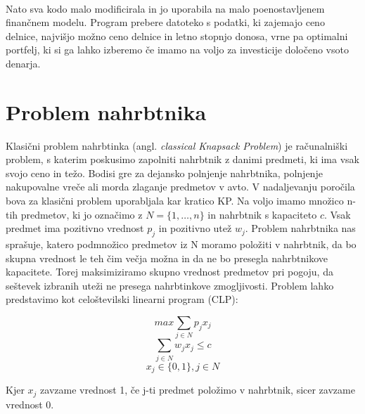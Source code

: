 \documentclass[a4paper,12pt]{article}
\theoremstyle{definition}
\begin{document}
\paragraph{}
Nato sva kodo malo modificirala in jo uporabila na malo poenostavljenem finančnem modelu. 
Program prebere datoteko s podatki, ki zajemajo ceno delnice, najvišjo možno ceno delnice in letno stopnjo donosa, vrne pa 
optimalni portfelj, ki si ga lahko izberemo če imamo na voljo za investicije določeno vsoto denarja.




\newpage
\section{Problem nahrbtnika}
\medskip
Klasični problem nahrbtinka (angl. \textit{classical Knapsack Problem}) je računalniški problem, s katerim poskusimo zapolniti 
nahrbtnik z danimi predmeti, ki ima vsak svojo ceno in težo. Bodisi gre za dejansko polnjenje nahrbtnika, polnjenje 
nakupovalne vreče ali morda zlaganje predmetov v avto. V nadaljevanju poročila bova za klasični problem uporabljala kar kratico KP. 
Na voljo imamo množico n-tih predmetov, ki jo označimo z $N = \{1, \dots, n\}$ in nahrbtnik s kapaciteto $c$. Vsak predmet ima 
pozitivno vrednost $p_{j}$ in pozitivno utež $w_{j}$. Problem nahrbtnika nas sprašuje, katero podmnožico predmetov iz N moramo 
položiti v nahrbtnik, da bo skupna vrednost le teh čim večja možna in da ne bo presegla nahrbtnikove kapacitete. 
Torej maksimiziramo skupno vrednost predmetov pri pogoju, da seštevek izbranih uteži ne presega nahrbtinkove zmogljivosti.
Problem lahko predstavimo kot celoštevilski linearni program (CLP):


\begin{equation}
    \tag*{}
     max \sum_{j \in N} p_{j}x_{j}
\end{equation}
\begin{equation}
    \tag*{}
    \sum_{j \in N} w_{j}x_{j} \leq c
\end{equation}
\begin{equation}
    \tag*{}
    x_{j} \in \{0,1\}, j \in N
\end{equation}

\medskip
\noindent Kjer $x_{j}$ zavzame vrednost 1, če j-ti predmet položimo v nahrbtnik,
 sicer zavzame vrednost 0. 
\end{document}
